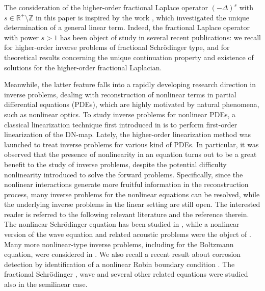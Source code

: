 \documentclass [oneside,11pt] {amsart}
\numberwithin{equation}{section}
\begin{document}
The consideration of the higher-order fractional Laplace operator $(-\Delta)^s$ with $s\in \mathbb R^+\setminus\mathbb Z$ in this paper is inspired by the work \cite{CMRU22}, which investigated the unique determination of a general linear term. 
Indeed, the fractional Laplace operator with power $s>1$ has been object of study in several recent publications: we recall \cite{CMRU22, DHP23} for higher-order inverse problems of fractional Schr\"odinger type, and \cite{AJ24, CSZ25, DPS25, FF20, GR19, RS15} for theoretical results concerning the unique continuation property and existence of solutions for the higher-order fractional Laplacian. 


Meanwhile, the latter feature falls into a rapidly developing research direction in inverse problems, dealing with reconstruction of nonlinear terms in partial differential equations (PDEs), which are highly motivated by natural phenomena, such as nonlinear optics. To study inverse problems for nonlinear PDEs, a classical linearization technique first introduced in \cite{Isakov93} is to perform first-order linearization of the DN-map. 
Lately, the higher-order linearization method \cite{KLU18} was launched to treat inverse problems for various kind of PDEs. In particular, it was observed that the presence of nonlinearity in an equation turns out to be a great benefit to the study of inverse problems, despite the potential difficulty nonlinearity introduced to solve the forward problems. Specifically, since the nonlinear interactions generate more fruitful information in the reconstruction process, many inverse problems for the nonlinear equations can be resolved, while the underlying inverse problems in the linear setting are still open.
The interested reader is referred to the following relevant literature and the reference therein. The nonlinear Schr\"odinger equation has been studied in \cite{lai_partial_2023, LUY24, Lai_inverse_2021,lassas_inverse_2024}, while a nonlinear version of the wave equation and related acoustic problems were the object of \cite{HTT25, Kal25b, Kal25,LLPT25}. Many more nonlinear-type inverse problems, including for the Boltzmann equation, were considered in \cite{KK25, lai_reconstruction_2021, lai_stable_2023, LZ24,LL25, NS25}. We also recall a recent result about corrosion detection by identification of a nonlinear Robin boundary condition \cite{J25}. The fractional Schr\"odinger \cite{KMS23, KMSS25, lai_global_2018}, wave \cite{LTZ24} and several other related equations \cite{JNS23, JNS25, lai_inverse_2022, lai_recovery_2022} were studied also in the semilinear case. 
 
\end{document}
